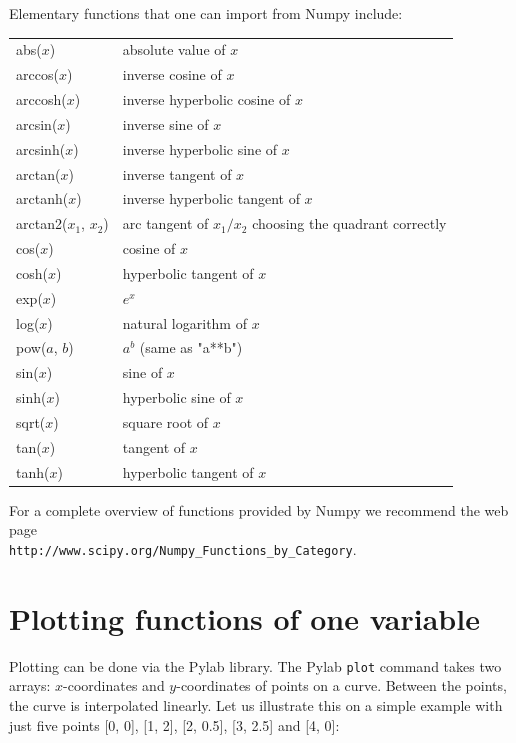 \documentclass{article}
\begin{document}
\newpage
\noindent
Elementary functions that one can import from Numpy include:\\

\begin{center}
\begin{tabular}{|l|l|}
\hline
abs($x$) &  absolute value of $x$\\
arccos($x$) &  inverse cosine of $x$ \\
arccosh($x$) &  inverse hyperbolic cosine of $x$ \\
arcsin($x$) & inverse sine of $x$ \\
arcsinh($x$) & inverse hyperbolic sine of $x$ \\
arctan($x$) & inverse tangent of $x$ \\
arctanh($x$) & inverse hyperbolic tangent of $x$ \\
arctan2($x_1$, $x_2$) & arc tangent of $x_1/x_2$ choosing the quadrant correctly \\
cos($x$) & cosine of $x$ \\
cosh($x$) & hyperbolic tangent of $x$ \\
exp($x$) & $e^x$ \\
log($x$) & natural logarithm of $x$ \\
pow($a$, $b$) & $a^b$ (same as "a**b")\\
sin($x$) & sine of $x$ \\
sinh($x$) & hyperbolic sine of $x$ \\
sqrt($x$) & square root of $x$ \\
tan($x$) & tangent of $x$\\
tanh($x$) & hyperbolic tangent of $x$ \\
\hline
\end{tabular}
\end{center}
\vspace{4mm}
\noindent
For a complete overview of functions provided by Numpy we recommend the 
web page \\ {\tt http://www.scipy.org/Numpy\_Functions\_by\_Category}.


\section{Plotting functions of one variable}\label{plotting}

Plotting can be done via the Pylab library. The Pylab {\tt plot} command takes two
arrays: $x$-coordinates and $y$-coordinates of points on a curve. Between the 
points, the curve is interpolated linearly. Let us illustrate this on a simple 
example with just five points [0, 0], [1, 2], [2, 0.5], [3, 2.5] and [4, 0]:
\end{document}
